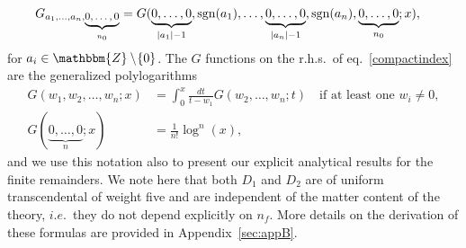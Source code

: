 \begin{align}
\label{compactindex}
G_{a_1,\dots,a_n,\footnotesize\underbrace{ 0,\dots,0}_{n_0}} &= G(\underbrace{0,\dots,0}_{|a_1|-1},\operatorname{sgn}(a_1),\dots,\underbrace{0,\dots,0}_{|a_n|-1},\operatorname{sgn}(a_n),\underbrace{0,\dots,0}_{n_0};x),
\end{align}
for $a_i \in \mathbbm{Z} \setminus\!\{0\}$.
The $G$ functions on the r.h.s.\ of eq.~\eqref{compactindex} are the generalized polylogarithms
\begin{align}
G(w_1,w_2,\dots,w_n; x)&= \int_0^x \frac{dt}{t-w_1} G(w_2,\dots,w_n; t) \quad \text{if at least one $w_i\neq 0$}, \\
G(\underbrace{0,\ldots,0}_{n}; x) &= \frac{1}{n!}\log^{n}(x),
\end{align}
and we use this notation also to present our explicit analytical results for the finite remainders.
We note here that both $D_1$ and $D_2$ are of uniform transcendental of weight five and are independent of the matter content of the theory, $i.e.$\ they do not depend
explicitly on $n_f$. 
More details on the derivation of these formulas are provided in Appendix~\ref{sec:appB}.
